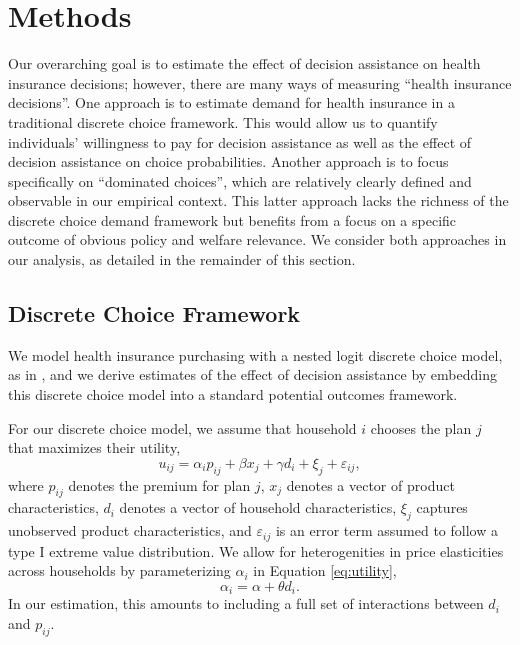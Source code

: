 \documentclass[12pt]{article}
\begin{document}
\section{Methods}
\label{sec:methods}

Our overarching goal is to estimate the effect of decision assistance on health insurance decisions; however, there are many ways of measuring ``health insurance decisions''. One approach is to estimate demand for health insurance in a traditional discrete choice framework. This would allow us to quantify individuals' willingness to pay for decision assistance as well as the effect of decision assistance on choice probabilities. Another approach is to focus specifically on ``dominated choices'', which are relatively clearly defined and observable in our empirical context. This latter approach lacks the richness of the discrete choice demand framework but benefits from a focus on a specific outcome of obvious policy and welfare relevance. We consider both approaches in our analysis, as detailed in the remainder of this section.

\subsection{Discrete Choice Framework}
\label{subsec:discrete-choice-framework}

We model health insurance purchasing with a nested logit discrete choice model, as in \cite{saltzman2019}, and we derive estimates of the effect of decision assistance by embedding this discrete choice model into a standard potential outcomes framework.

For our discrete choice model, we assume that household \(i\) chooses the plan \(j\) that maximizes their utility,
\begin{equation}
u_{ij} = \alpha_{i}p_{ij} + \beta x_{j} + \gamma d_{i} + \xi_{j} + \varepsilon_{ij}, \label{eq:utility}
\end{equation}
where \(p_{ij}\) denotes the premium for plan \(j\), \(x_{j}\) denotes a vector of product characteristics, \(d_{i}\) denotes a vector of household characteristics, \(\xi_{j}\) captures unobserved product characteristics, and \(\varepsilon_{ij}\) is an error term assumed to follow a type I extreme value distribution. We allow for heterogenities in price elasticities across households by parameterizing \(\alpha_{i}\) in Equation \eqref{eq:utility}, \[\alpha_{i} = \alpha + \theta d_{i}.\] In our estimation, this amounts to including a full set of interactions between \(d_{i}\) and \(p_{ij}\).
\end{document}
